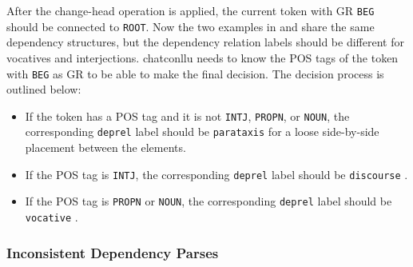 After the change-head operation is applied, the current token with GR \texttt{BEG} should be connected to \texttt{ROOT}. Now the two examples in  and  share the same dependency structures, but the dependency relation labels should be different for vocatives and interjections. chatconllu needs to know the POS tags of the token with \texttt{BEG} as GR to be able to make the final decision. The decision process is outlined below:\\

\begin{itemize}
	\item If the token has a POS tag and it is not \texttt{INTJ}, \texttt{PROPN}, or \texttt{NOUN}, the corresponding \texttt{deprel}  label should be \texttt{parataxis} for a loose side-by-side placement between the elements.
	\item If the POS tag is \texttt{INTJ}, the corresponding \texttt{deprel} label should be \texttt{discourse} .
	\item If the POS tag is \texttt{PROPN} or \texttt{NOUN}, the corresponding \texttt{deprel} label should be \texttt{vocative} .
\end{itemize}

\subsubsection{Inconsistent Dependency Parses}


